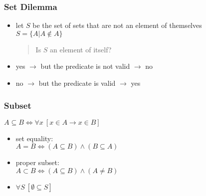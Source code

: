\documentclass[dvipsnames]{beamer}
\begin{document}
\begin{frame}
  \frametitle{Set Dilemma}

  \begin{itemize}
    \item let $S$ be the set of sets that are not an element of themselves\\
      $S = \{A | A \notin A\}$

    \pause
    \begin{quote}
      Is $S$ an element of itself?
    \end{quote}

    \pause
    \item yes $\rightarrow$ but the predicate is not valid $\rightarrow$ no

    \pause
    \item no $\rightarrow$ but the predicate is valid $\rightarrow$ yes
  \end{itemize}
\end{frame}


\begin{frame}
  \frametitle{Subset}

  \begin{definition}
    $A \subseteq B \Leftrightarrow \forall x~[x \in A \rightarrow x \in B]$
  \end{definition}

  \pause
  \begin{itemize}
    \item \alert{set equality}:\\
      $A = B \Leftrightarrow (A \subseteq B) \wedge (B \subseteq A)$

    \pause
    \item \alert{proper subset}:\\
      $A \subset B \Leftrightarrow (A \subseteq B) \wedge (A \neq B)$

    \pause
    \item $\forall S~[\emptyset \subseteq S]$
  \end{itemize}
\end{frame}
\end{document}
